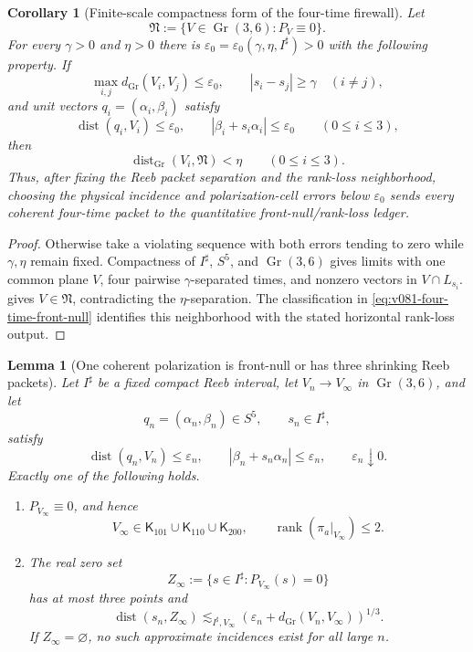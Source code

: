 \documentclass[10pt]{article}
\newtheorem{lemma}[theorem]{Lemma}
\newtheorem{corollary}[theorem]{Corollary}
\newcommand{\rank}{\operatorname{rank}}
\newcommand{\dist}{\operatorname{dist}}
\newcommand{\Gr}{\operatorname{Gr}}
\begin{document}
\begin{corollary}[Finite-scale compactness form of the four-time firewall]
\label{cor:v081-finite-scale-four-time-firewall}
Let
\[
\mathfrak N
:=
\{V\in\Gr(3,6):P_V\equiv0\}.
\]
For every \(\gamma>0\) and \(\eta>0\) there is
\(\varepsilon_0=\varepsilon_0(\gamma,\eta,I^\sharp)>0\) with the following property.  If
\[
\max_{i,j}d_{\Gr}(V_i,V_j)\le\varepsilon_0,
\qquad
|s_i-s_j|\ge\gamma\quad(i\ne j),
\]
and unit vectors \(q_i=(\alpha_i,\beta_i)\) satisfy
\[
\dist(q_i,V_i)\le\varepsilon_0,
\qquad
|\beta_i+s_i\alpha_i|\le\varepsilon_0
\qquad(0\le i\le3),
\]
then
\[
\dist_{\Gr}(V_i,\mathfrak N)<\eta
\qquad(0\le i\le3).
\]
Thus, after fixing the Reeb packet separation and the rank-loss neighborhood, choosing the
physical incidence and polarization-cell errors below \(\varepsilon_0\) sends every coherent
four-time packet to the quantitative front-null/rank-loss ledger.
\end{corollary}

\begin{proof}
Otherwise take a violating sequence with both errors tending to zero while \(\gamma,\eta\) remain
fixed.  Compactness of \(I^\sharp\), \(S^5\), and \(\Gr(3,6)\) gives limits with one common plane
\(V\), four pairwise \(\gamma\)-separated times, and nonzero vectors in
\(V\cap L_{s_i}\).   gives \(V\in\mathfrak N\), contradicting the
\(\eta\)-separation.  The classification in
\eqref{eq:v081-four-time-front-null} identifies this neighborhood with the stated horizontal
rank-loss output.
\end{proof}

\begin{lemma}[One coherent polarization is front-null or has three shrinking Reeb packets]
\label{lem:v081-coherent-plane-three-time-packets}
Let \(I^\sharp\) be a fixed compact Reeb interval, let \(V_n\to V_\infty\) in
\(\Gr(3,6)\), and let
\[
q_n=(\alpha_n,\beta_n)\in S^5,
\qquad
s_n\in I^\sharp,
\]
satisfy
\[
\dist(q_n,V_n)\le\varepsilon_n,
\qquad
|\beta_n+s_n\alpha_n|\le\varepsilon_n,
\qquad
\varepsilon_n\downarrow0.
\]
Exactly one of the following holds.
\begin{enumerate}[label=\textnormal{(\roman*)}]
\item \(P_{V_\infty}\equiv0\), and hence
\[
V_\infty\in
\mathsf K_{101}\cup\mathsf K_{110}\cup\mathsf K_{200},
\qquad
\rank(\pi_a|_{V_\infty})\le2.
\]
\item The real zero set
\[
Z_\infty
:=
\{s\in I^\sharp:P_{V_\infty}(s)=0\}
\]
has at most three points and
\begin{equation}
\label{eq:v081-coherent-three-time-packet-width}
\boxed{
\dist(s_n,Z_\infty)
\lesssim_{I^\sharp,V_\infty}
\left(
\varepsilon_n+d_{\Gr}(V_n,V_\infty)
\right)^{1/3}.
}
\end{equation}
If \(Z_\infty=\varnothing\), no such approximate incidences exist for all large \(n\).
\end{enumerate}
\end{lemma}
\end{document}
